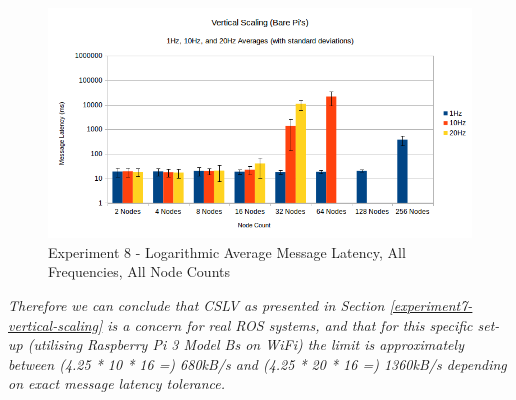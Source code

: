\documentclass[../dissertation.tex]{subfiles}
\begin{document}
\begin{figure}[H]
\centering
\includegraphics[width=\textwidth]{images/experiment9/vertical_scaling_all_freqs_log_avg_msg_latency.png}
\caption{Experiment 8 - Logarithmic Average Message Latency, All Frequencies, All Node Counts}
\label{exp8-all-freqs-averages}
\end{figure}

\textit{Therefore we can conclude that CSLV as presented in Section \ref{experiment7-vertical-scaling} is a concern for real ROS systems, and that for this specific set-up (utilising Raspberry Pi 3 Model Bs on WiFi) the limit is approximately between (4.25 * 10 * 16 =) 680kB/s and (4.25 * 20 * 16 =) 1360kB/s depending on exact message latency tolerance.}
\end{document}
